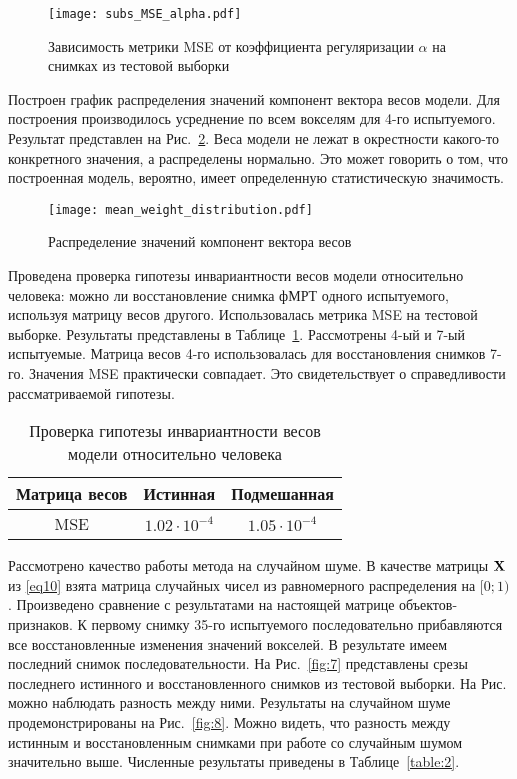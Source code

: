 \documentclass[a4paper, 12pt]{article}
\begin{document}
	\begin{figure}[h!]
		\centering
		\texttt{[image: subs\_MSE\_alpha.pdf]}
		\caption{Зависимость метрики MSE от коэффициента регуляризации $\alpha$ на снимках из тестовой выборки}
		\label{fig:5}
	\end{figure}

	Построен график распределения значений компонент вектора весов модели.
	Для построения производилось усреднение по всем вокселям для 4-го испытуемого.
	Результат представлен на Рис.~\ref{fig:6}.
	Веса модели не лежат в окрестности какого-то конкретного значения, а распределены нормально.
	Это может говорить о том, что построенная модель, вероятно, имеет определенную
	статистическую значимость.

	\begin{figure}[h!]
		\centering
		\texttt{[image: mean\_weight\_distribution.pdf]}
		\caption{Распределение значений компонент вектора весов}
		\label{fig:6}
	\end{figure}

	Проведена проверка гипотезы инвариантности весов модели относительно человека:
	можно ли восстановление снимка фМРТ одного испытуемого, используя
	матрицу весов другого. Использовалась метрика MSE на тестовой выборке.
	Результаты представлены в Таблице~\ref{table:inv}.
	Рассмотрены 4-ый и 7-ый испытуемые. Матрица весов 4-го использовалась для восстановления
	снимков 7-го.
	Значения MSE практически совпадает. Это свидетельствует о справедливости рассматриваемой
	гипотезы.

	\begin{table}[h!]
		\centering
		\begin{tabular}{|c|c|c|}
			\hline
			Матрица весов	&	Истинная	&	Подмешанная \\ \hline \hline
			MSE		& 	$1.02 \cdot 10^{-4}$	 &		$1.05 \cdot 10^{-4}$ \\ \hline
		\end{tabular}
		\caption{Проверка гипотезы инвариантности весов модели относительно человека}
		\label{table:inv}
	\end{table}

	Рассмотрено качество работы метода на случайном шуме. В качестве матрицы $\mathbf{X}$ из \eqref{eq10}
	взята матрица случайных чисел из равномерного распределения на $[0; 1)$. 
	Произведено сравнение с результатами на настоящей матрице объектов-признаков. 
	К первому снимку 35-го испытуемого последовательно прибавляются все восстановленные 
	изменения значений вокселей. 
	В результате имеем последний снимок последовательности. На Рис.~\ref*{fig:7}
	представлены срезы последнего истинного и восстановленного снимков из тестовой выборки. 
	На Рис. можно наблюдать разность между ними.
	Результаты на случайном шуме продемонстрированы на Рис.~\ref*{fig:8}.
	Можно видеть, что разность между истинным и восстановленным снимками при работе со случайным шумом
	значительно выше. Численные результаты приведены в Таблице~\ref{table:2}.
\end{document}
